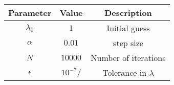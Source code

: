 
\begin{center}
\begin{tabular}{|c|c|c|}
\hline
	\textbf{Parameter}& \textbf{Value}& \textbf{Description}\\ \hline
	$\lambda_0$	&$1$		        &Initial guess\\ \hline
	$\alpha$	&$0.01$	                &step size\\ \hline
	$N$	        &$10000$                &Number of iterations\\ \hline
	$\epsilon$	&$10^{-7}/$             &Tolerance in $\lambda$\\ \hline
\end{tabular}
\end{center}
